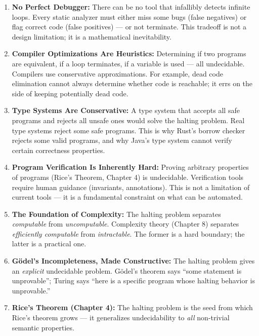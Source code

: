\begin{enumerate}
\item \textbf{No Perfect Debugger:} There can be no tool that infallibly detects infinite loops. Every static analyzer must either miss some bugs (false negatives) or flag correct code (false positives) — or not terminate. This tradeoff is not a design limitation; it is a mathematical inevitability.

\item \textbf{Compiler Optimizations Are Heuristics:} Determining if two programs are equivalent, if a loop terminates, if a variable is used — all undecidable. Compilers use conservative approximations. For example, dead code elimination cannot always determine whether code is reachable; it errs on the side of keeping potentially dead code.

\item \textbf{Type Systems Are Conservative:} A type system that accepts all safe programs and rejects all unsafe ones would solve the halting problem. Real type systems reject some safe programs. This is why Rust's borrow checker rejects some valid programs, and why Java's type system cannot verify certain correctness properties.

\item \textbf{Program Verification Is Inherently Hard:} Proving arbitrary properties of programs (Rice's Theorem, Chapter 4) is undecidable. Verification tools require human guidance (invariants, annotations). This is not a limitation of current tools — it is a fundamental constraint on what can be automated.

\item \textbf{The Foundation of Complexity:} The halting problem separates \emph{computable} from \emph{uncomputable}. Complexity theory (Chapter 8) separates \emph{efficiently computable} from \emph{intractable}. The former is a hard boundary; the latter is a practical one.

\item \textbf{G\"odel's Incompleteness, Made Constructive:} The halting problem gives an \emph{explicit} undecidable problem. G\"odel's theorem says ``some statement is unprovable''; Turing says ``here is a specific program whose halting behavior is unprovable.''

\item \textbf{Rice's Theorem (Chapter 4):} The halting problem is the seed from which Rice's theorem grows — it generalizes undecidability to \emph{all} non-trivial semantic properties.


\end{enumerate}
